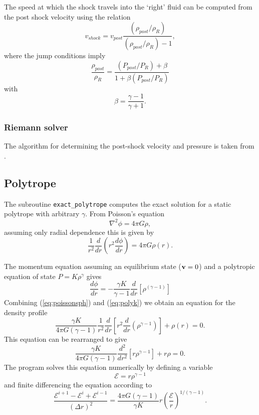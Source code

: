 \documentclass[a4paper,11pt]{article}
\begin{document}
 The speed at which the shock travels into the `right' fluid can be computed from the post shock
velocity using the relation
\begin{equation}
v_{shock} = v_{post}\frac{(\rho_{post}/\rho_R)}{(\rho_{post}/\rho_R)- 1},
\end{equation}
where the jump conditions imply
\begin{equation}
\frac{\rho_{post}}{\rho_R} = \frac{(P_{post}/P_R) + \beta}{1 + \beta (P_{post}/P_R)}
\end{equation}
with
\begin{equation}
\beta = \frac{\gamma - 1}{\gamma + 1}.
\end{equation}

\subsubsection{ Riemann solver}
 The algorithm for determining the post-shock velocity and pressure is taken
from \citet{toro92}.

\subsection{Polytrope}
 The subroutine \verb+exact_polytrope+ computes the exact solution for a static polytrope with
arbitrary $\gamma$. From Poisson's equation
\begin{equation}
\nabla^2 \phi = 4\pi G \rho,
\end{equation}
assuming only radial dependence this is given by
\begin{equation}
\frac{1}{r^{2}} \frac{d}{dr} \left(r^{2} \frac{d\phi}{dr} \right) = 4\pi G \rho(r).
\label{eq:poissonsph}
\end{equation}
  
  The momentum equation assuming an equilibrium state (${\bf v} = 0$) and a
polytropic equation of state $P = K\rho^{\gamma}$ gives
\begin{equation}
\frac{d\phi}{dr} = - \frac{\gamma K}{\gamma-1}\frac{d}{dr} \left[\rho^{(\gamma -1)} \right]
\label{eq:polyk}
\end{equation}
Combining (\ref{eq:poissonsph}) and (\ref{eq:polyk}) we obtain an equation for the density profile
\begin{equation}
\frac{\gamma K}{4\pi G (\gamma - 1)} \frac{1}{r^{2}} \frac{d}{dr} \left[r^{2}
\frac{d}{dr}\left( \rho^{\gamma-1} \right) \right] + \rho(r) = 0.
\label{eq:dens}
\end{equation}
This equation can be rearranged to give
\begin{equation}
\frac{\gamma K}{4\pi G (\gamma - 1)} \frac{d^2}{dr^2}
\left[r\rho^{\gamma-1}\right] + r\rho = 0.
\end{equation}
 The program solves this equation numerically by defining a variable
\begin{equation}
\mathcal{E} = r \rho^{\gamma-1}
\end{equation}
and finite differencing the equation according to
\begin{equation}
\frac{\mathcal{E}^{i+1} - \mathcal{E}^i + \mathcal{E}^{i-1}}{(\Delta r)^2} =
\frac{4\pi G (\gamma - 1)}{\gamma K} r
\left(\frac{\mathcal{E}}{r}\right)^{1/(\gamma-1)}.
\end{equation}
\end{document}
